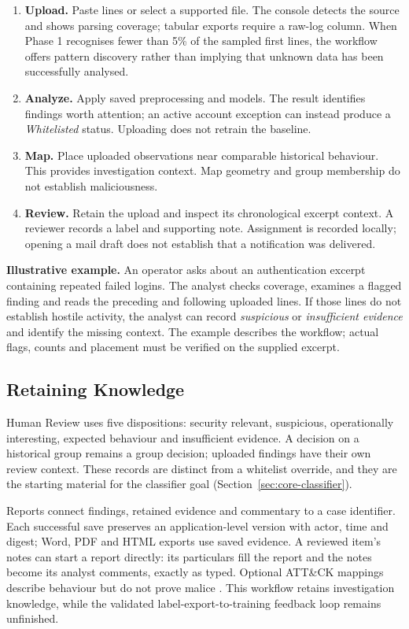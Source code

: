 \documentclass[11pt,a4paper]{article}
\begin{document}
\begin{enumerate}
\item \textbf{Upload.} Paste lines or select a supported file. The console detects the source and shows parsing coverage; tabular exports require a raw-log column. When Phase 1 recognises fewer than 5\% of the sampled first lines, the workflow offers pattern discovery rather than implying that unknown data has been successfully analysed.
\item \textbf{Analyze.} Apply saved preprocessing and models. The result identifies findings worth attention; an active account exception can instead produce a \emph{Whitelisted} status. Uploading does not retrain the baseline.
\item \textbf{Map.} Place uploaded observations near comparable historical behaviour. This provides investigation context. Map geometry and group membership do not establish maliciousness.
\item \textbf{Review.} Retain the upload and inspect its chronological excerpt context. A reviewer records a label and supporting note. Assignment is recorded locally; opening a mail draft does not establish that a notification was delivered.
\end{enumerate}

\textbf{Illustrative example.} An operator asks about an authentication excerpt containing repeated failed logins. The analyst checks coverage, examines a flagged finding and reads the preceding and following uploaded lines. If those lines do not establish hostile activity, the analyst can record \emph{suspicious} or \emph{insufficient evidence} and identify the missing context. The example describes the workflow; actual flags, counts and placement must be verified on the supplied excerpt.

\subsection{Retaining Knowledge}

Human Review uses five dispositions: security relevant, suspicious, operationally interesting, expected behaviour and insufficient evidence. A decision on a historical group remains a group decision; uploaded findings have their own review context. These records are distinct from a whitelist override, and they are the starting material for the classifier goal (Section~\ref{sec:core-classifier}).

Reports connect findings, retained evidence and commentary to a case identifier. Each successful save preserves an application-level version with actor, time and digest; Word, PDF and HTML exports use saved evidence. A reviewed item's notes can start a report directly: its particulars fill the report and the notes become its analyst comments, exactly as typed. Optional ATT\&CK mappings describe behaviour but do not prove malice \cite{ref10}. This workflow retains investigation knowledge, while the validated label-export-to-training feedback loop remains unfinished.
\end{document}
